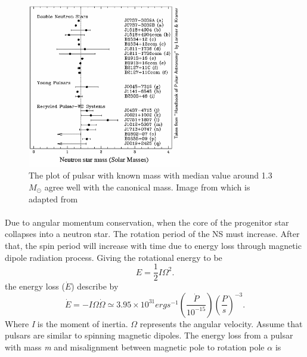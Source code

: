 \documentclass[thesis_msc.tex]{subfiles}
\begin{document}
        \begin{figure}[h] \centering
\includegraphics[width=0.6\textwidth]{figures/Mass.png}
\caption{The plot of pulsar with known mass with median value around 1.3 $M_\odot$ agree well with the canonical mass. Image from \cite{handbook} which is adapted from \citep{stairs2004pulsars}}
\label{mass}
\end{figure}

    \paragraph{} Due to angular momentum conservation, when the core of the progenitor star collapses into a neutron star.  The rotation period of the NS must increase. After that, the spin period will increase with time due to energy loss through magnetic dipole radiation process. Giving the rotational energy to be 
    \begin{equation}
    E=\frac{1}{2} I \Omega^2.
    \end{equation}
    the energy loss ($\dot{E}$) describe by 
    \begin{equation}
    \dot{E}=-I\Omega\dot{\Omega}\simeq 3.95\times10^{31}erg s^{-1} (\frac{\dot{P}}{10^{-15}})(\frac{P}{s})^{-3}.
    \end{equation}
    Where \textit{I} is the moment of inertia. $\Omega$ represents the angular velocity. Assume that pulsars are similar to spinning magnetic dipoles. The energy loss from  a pulsar with mass \textit{m} and misalignment between magnetic pole to rotation pole $\alpha$ is 
   
\end{document}

